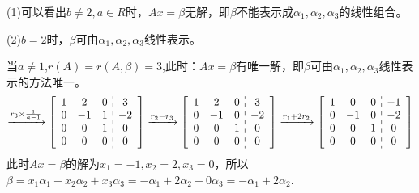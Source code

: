\documentclass{article}
\begin{document}
\begin{jie}
(1)可以看出$b\neq2,a\in R$时，$Ax=\beta$无解，即$\beta$不能表示成$\alpha_{1},\alpha_{2},\alpha_{3}$的线性组合。

(2)$b=2$时，$\beta$可由$\alpha_{1},\alpha_{2},\alpha_{3}$线性表示。

当$a\neq1$,$r(A)=r(A,\beta)=3$,此时：$Ax=\beta$有唯一解，即$\beta$可由$\alpha_{1},\alpha_{2},\alpha_{3}$线性表示的方法唯一。
\begin{align*}
\xrightarrow{r_{3}\times \frac{1}{a-1}}
{
\left[
\begin{array}{c:c}
\begin{matrix}
1 & 2 & 0 \\
  0 & -1 & 1 \\
   0& 0&1\\
 0 & 0 & 0
\end{matrix}&
\begin{matrix}
3  \\
-2\\
0\\
0
\end{matrix}
\end{array}
\right]
}
\xrightarrow{r_2-r_{3}}
{
\left[
\begin{array}{c:c}
\begin{matrix}
1 & 2 & 0 \\
  0 & -1 & 0 \\
   0& 0&1\\
 0 & 0 & 0
\end{matrix}&
\begin{matrix}
3  \\
-2\\
0\\
0
\end{matrix}
\end{array}
\right]
}\xrightarrow{r_1+2r_{2}}
{
\left[
\begin{array}{c:c}
\begin{matrix}
1 & 0 & 0 \\
  0 & -1 & 0 \\
   0& 0&1\\
 0 & 0 & 0
\end{matrix}&
\begin{matrix}
-1  \\
-2\\
0\\
0
\end{matrix}
\end{array}
\right]
}
\end{align*}
此时$Ax=\beta$的解为$x_{1}=-1,x_{2}=2,x_{3}=0$，所以$\beta=x_{1}\alpha_{1}+x_{2}\alpha_{2}+x_{3}\alpha_{3}=-\alpha_{1}+2\alpha_{2}+0\alpha_{3}=-\alpha_{1}+2\alpha_{2}$.


\end{jie}
\end{document}
